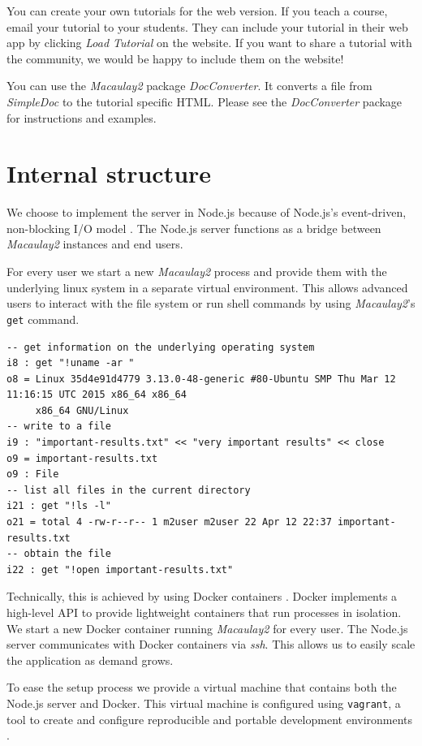 \documentclass[twocolumn]{article}
\def\M2{{\it Macaulay2}}
\begin{document}
You can create your own tutorials for the web version. If you teach a course,
email your tutorial to your students. They can include your tutorial in their web app by clicking
{\it Load Tutorial} on the website.
If you want to share a tutorial with the community, we would
be happy to include them on the website!

You can use the \M2 package {\it DocConverter}.
It converts a file from {\it SimpleDoc} to the tutorial specific HTML. Please see the
{\it DocConverter} package for instructions and examples.


\section{Internal structure}

We choose to implement the server in Node.js
because of Node.js's event-driven, non-blocking I/O model \cite{nodejs}.
The Node.js server functions as a bridge between \M2 instances and end users.

For every user we start a new \M2 process and
provide them with the underlying linux system in a separate virtual environment.
This allows advanced users to
interact with the file system or run shell commands by using \M2's {\tt get} command.

\begin{lstlisting}[breaklines]
-- get information on the underlying operating system
i8 : get "!uname -ar "
o8 = Linux 35d4e91d4779 3.13.0-48-generic #80-Ubuntu SMP Thu Mar 12 11:16:15 UTC 2015 x86_64 x86_64
     x86_64 GNU/Linux
-- write to a file     
i9 : "important-results.txt" << "very important results" << close
o9 = important-results.txt
o9 : File
-- list all files in the current directory
i21 : get "!ls -l"
o21 = total 4 -rw-r--r-- 1 m2user m2user 22 Apr 12 22:37 important-results.txt
-- obtain the file
i22 : get "!open important-results.txt"
\end{lstlisting}

Technically, this is achieved by using Docker containers \cite{docker}. Docker implements
a high-level API to provide lightweight containers that run processes in isolation.
We start a new Docker container running \M2 for every user. The Node.js
server communicates with Docker containers via {\it ssh}. This allows us to easily
scale the application as demand grows.

To ease the setup process we provide a virtual machine that contains both the Node.js server
and Docker. This virtual machine is configured using {\tt vagrant}, a tool to create and
configure reproducible and portable development environments \cite{vagrant}.
\end{document}
